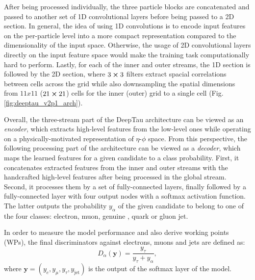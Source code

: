 After being processed individually, the three particle blocks are concatenated and passed to another set of 1D convolutional layers before being passed to a 2D section. In general, the idea of using 1D convolutions is to encode input features on the per-particle level into a more compact representation compared to the dimensionality of the input space. Otherwise, the  usage of 2D convolutional layers directly on the input feature space would make the training task computationally hard to perform. Lastly, for each of the inner and outer streams, the 1D section is followed by the 2D section, where $3\cross3$ filters extract spacial correlations between cells across the grid while also downsampling the spatial dimensions from $11x11$ ($21\cross21$) cells for the inner (outer) grid to a single cell (Fig. \ref{fig:deeptau_v2p1_arch}). 

Overall, the three-stream part of the DeepTau architecture can be viewed as an \textit{encoder}, which extracts high-level features from the low-level ones while operating on a physically-motivated representation of $\eta$-$\phi$ space. From this perspective, the following processing part of the architecture can be viewed as a \textit{decoder}, which maps the learned features for a given \tauh candidate to a class probability. First, it concatenates extracted features from the inner and outer streams with the handcrafted high-level features after being processed in the global stream. Second, it processes them by a set of fully-connected layers, finally followed by a fully-connected layer with four output nodes with a softmax activation function. The latter outputs the probability $y_\alpha$ of the given \tauh candidate to belong to one of the four classes: electron, muon, genuine \tauh, quark or gluon jet. 

In order to measure the model performance and also derive working points (WPs), the final discriminators against electrons, muons and jets are defined as:
\begin{equation} \label{eq:d_alpha}
    D_\alpha(\bm{y}) = \dfrac{y_\tau}{y_\tau + y_\alpha},
\end{equation}
where $\bm{y} = (y_e, y_\mu, y_\tau, y_\text{jet})$ is the output of the softmax layer of the model.

